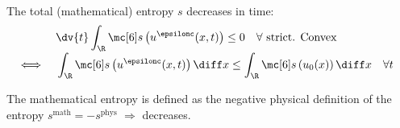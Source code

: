 \begin{lawbox}\nospacing
    \begin{law}\label{law:2nd_laws_of_themordynamics}\leavevmode\\
        The total (mathematical) entropy $s$ decreases in time:
        \begin{align}
          &&&\dv{t}\int_{\R}\entropy \left(u^{\epsilonc}(x,t)\right)\leq0\quad\forall\text{ strict. Convex}\\[-1\jot]
          &\iff&&\int_{\R}\entropy \left(u^{\epsilonc}(x,t)\right)\diff x\leq
                 \int_{\R}\entropy \left(u_{0}(x)\right)\diff x&&\forall t
        \end{align}
    \end{law}
\end{lawbox}
\begin{notebox}\nospacing
   The mathematical entropy is defined as the negative physical definition of the entropy $s^{\text{math}}=-s^{\text{phys}}$  $\Rightarrow$ decreases.
\end{notebox}



